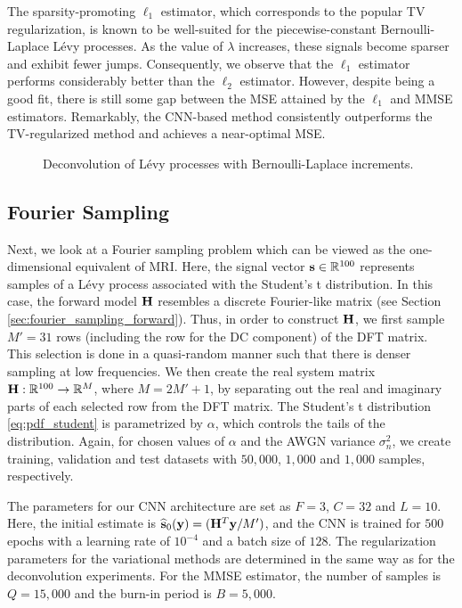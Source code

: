 \documentclass[journal]{IEEEtran}
\begin{document}
The sparsity-promoting $\ell_1$ estimator, which corresponds to the popular TV regularization, is known to be well-suited for the piecewise-constant Bernoulli-Laplace L\'{e}vy processes. As the value of $\lambda$ increases, these signals become sparser and exhibit fewer jumps. Consequently, we observe that the $\ell_1$ estimator performs considerably better than the $\ell_2$ estimator. However, despite being a good fit, there is still some gap between the MSE attained by the $\ell_1$ and MMSE estimators. Remarkably, the CNN-based method consistently outperforms the TV-regularized method and achieves a near-optimal MSE.



\begin{figure}[t]
    \centering
    
    \vspace{-10pt}
    \caption{Deconvolution of L\'{e}vy processes with Bernoulli-Laplace increments.}
    \label{fig:deconvolution_bl}
\end{figure}


\subsection{Fourier Sampling}
Next, we look at a Fourier sampling problem which can be viewed as the one-dimensional equivalent of MRI. Here, the signal vector ${\bf{s}} \in \mathbb{R}^{100}$ represents samples of a L\'{e}vy process associated with the Student's t distribution. In this case, the forward model ${\bf{H}}$ resembles a discrete Fourier-like matrix (see Section \ref{sec:fourier_sampling_forward}). Thus, in order to construct ${\bf{H}}$, we first sample $M' = 31$ rows (including the row for the DC component) of the DFT matrix. This selection is done in a quasi-random manner such that there is denser sampling at low frequencies. We then create the real system matrix ${\bf{H}}: \mathbb{R}^{100} \rightarrow \mathbb{R}^{M}$, where $M = 2M' + 1$, by separating out the real and imaginary parts of each selected row from the DFT matrix. The Student's t distribution \eqref{eq:pdf_student} is parametrized by $\alpha$, which controls the tails of the distribution. Again, for chosen values of $\alpha$ and the AWGN variance $\sigma_n^{2}$, we create training, validation and test datasets with $50,000$, $1,000$ and $1,000$ samples, respectively.

The parameters for our CNN architecture are set as $F=3$, $C=32$ and $L=10$. Here, the initial estimate is $\widehat{{\bf{s}}}_{0}({\bf{y}}) = ({\bf{H}}^{T} {\bf{y}} / M')$, and the CNN is trained for $500$ epochs with a learning rate of $10^{-4}$ and a batch size of $128$. The regularization parameters for the variational methods are determined in the same way as for the deconvolution experiments. For the MMSE estimator, the number of samples is $Q=15,000$ and the burn-in period is $B=5,000$.
\end{document}
